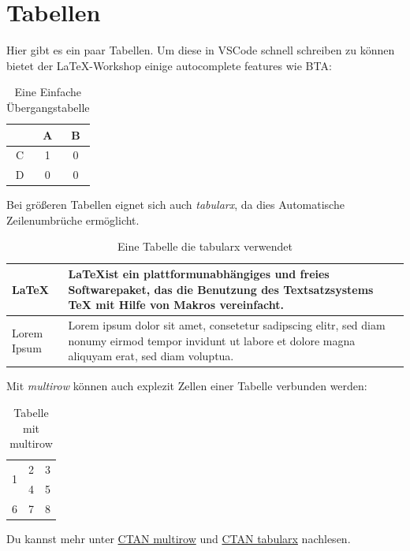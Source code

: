 \section{Tabellen}
\label{sec:tabellen}

Hier gibt es ein paar Tabellen. Um diese in VSCode schnell schreiben zu können bietet der \LaTeX-Workshop einige autocomplete features wie BTA:

\begin{table}[ht]
    \centering
    \begin{tabular}{|c|cc|}
        \hline
         & A & B \\
        \hline
        C & 1 & 0 \\
        D & 0 & 0 \\
        \hline
    \end{tabular}
    \caption{Eine Einfache Übergangstabelle}
    \label{tab:simpleTable}
\end{table}

Bei größeren Tabellen eignet sich auch \textit{tabularx}, da dies Automatische Zeilenumbrüche ermöglicht.

\begin{table}[ht]
    \centering
    \begin{tabularx}{0.9\textwidth}{|X|X|}
        \hline
        \LaTeX & \LaTeX ist ein plattformunabhängiges und freies Softwarepaket, das die Benutzung des Textsatzsystems TeX mit Hilfe von Makros vereinfacht.\\
        \hline
        Lorem Ipsum & Lorem ipsum dolor sit amet, consetetur sadipscing elitr, sed diam nonumy eirmod tempor invidunt ut labore et dolore magna aliquyam erat, sed diam voluptua. \\
        \hline
    \end{tabularx}
    \caption{Eine Tabelle die tabularx verwendet}
    \label{tab:tabularx}
\end{table}

Mit \textit{multirow} können auch explezit Zellen einer Tabelle verbunden werden:

\begin{table}[ht]
    \centering
    \begin{tabular}{|c|c|c|}
        \hline
        \multirow{2}{*}{1} & 2 & 3 \\
         & 4 & 5 \\\hline
        6 & 7 & 8 \\\hline
    \end{tabular}
    \caption{Tabelle mit multirow}
    \label{tab:multirow}
\end{table}

Du kannst mehr unter \href{https://ctan.org/pkg/multirow}{CTAN multirow} und \href{https://ctan.org/pkg/tabularx}{CTAN tabularx} nachlesen.